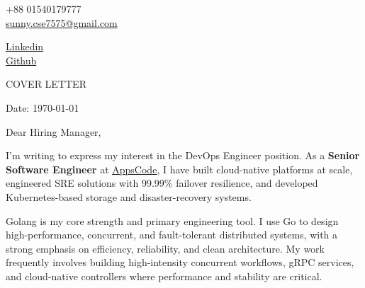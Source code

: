 \documentclass[12pt,a4]{article}
\begin{document}
\begin{center}
    \begin{minipage}[b]{0.48\textwidth}
            \large +88 01540179777 \\
            \large \href{mailto:sunny.cse7575@gmail.com}{sunny.cse7575@gmail.com} 
    \end{minipage}%
    \hfill  %
    \begin{minipage}[b]{0.48\textwidth}
            \flushright \large
            {\href{https://www.linkedin.com/in/anisur-rahman75/}{Linkedin}} \\
            \href{https://github.com/anisurrahman75}{Github}
    \end{minipage}   
    
\vspace{0.2cm} 
{\color{UI_blue} \hrulefill}
\end{center}

\justify
\setlength{\parindent}{0pt}
\setlength{\parskip}{16pt}
\vspace{0.2cm}
\begin{center}
    {\color{UI_blue} \Large{COVER LETTER}}
\end{center}



Date: \today \par \vspace{-0.1cm}
Dear Hiring Manager, %


I’m writing to express my interest in the DevOps Engineer position. As a \textbf{Senior Software Engineer} at {}{\href{https://appscode.com/}{\underline{AppsCode}}}, I have built cloud-native platforms at scale, engineered SRE solutions with 99.99\% failover resilience, and developed Kubernetes-based storage and disaster-recovery systems.

Golang is my core strength and primary engineering tool. I use Go to design high-performance, concurrent, and fault-tolerant distributed systems, with a strong emphasis on efficiency, reliability, and clean architecture. My work frequently involves building high-intensity concurrent workflows, gRPC services, and cloud-native controllers where performance and stability are critical.
\end{document}
